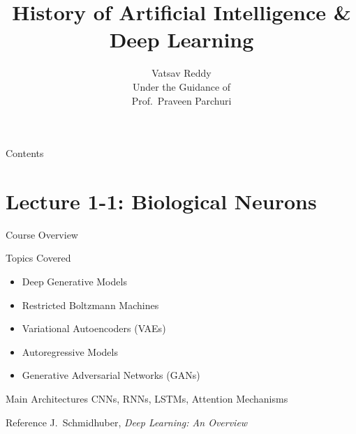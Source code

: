 \documentclass{beamer}
\title[History of AI \& Deep Learning]
{History of Artificial Intelligence \& Deep Learning}
\begin{document}
\begin{frame}
\titlepage
\end{frame}

\begin{frame}{Contents}
\tableofcontents
\end{frame}
\author[Vatsav Reddy]
{
{\Large Vatsav Reddy}\\
\vspace{0.2cm}
{\small Under the Guidance of}\\
{\small Prof.\ Praveen Parchuri}
}


\section{Lecture 1-1: Biological Neurons}

\begin{frame}{Course Overview}

\begin{block}{Topics Covered}
\begin{itemize}
\item Deep Generative Models
\item Restricted Boltzmann Machines
\item Variational Autoencoders (VAEs)
\item Autoregressive Models
\item Generative Adversarial Networks (GANs)
\end{itemize}
\end{block}

\vspace{0.2cm}

\begin{block}{Main Architectures}
CNNs, RNNs, LSTMs, Attention Mechanisms
\end{block}

\vspace{0.2cm}

\begin{exampleblock}{Reference}
J.\ Schmidhuber, \textit{Deep Learning: An Overview}
\end{exampleblock}

\end{frame}
\end{document}
